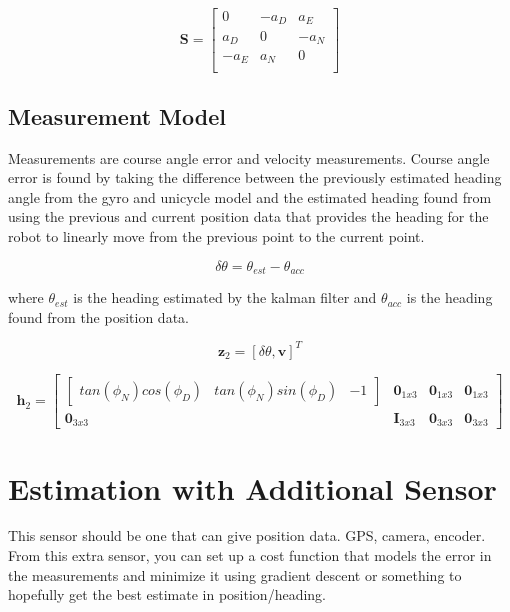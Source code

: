 \begin{equation}
  \boldsymbol{S} = \begin{bmatrix}
        0 & -a_D & a_E \\
        a_D & 0 & -a_N \\
        -a_E & a_N & 0 \\
      \end{bmatrix}
\end{equation}

\subsection{Measurement Model}

Measurements are course angle error and velocity measurements. Course angle error
is found by taking the difference between the previously estimated heading angle from the 
gyro and unicycle model and the estimated heading found from using the previous 
and current position data that provides the heading for the robot to linearly 
move from the previous point to the current point.

\begin{equation}
  \delta\theta = \theta_{est} - \theta_{acc}
\end{equation}

where $\theta_{est}$ is the heading estimated by the kalman filter and $\theta_{acc}$ 
is the heading found from the position data. 

\begin{equation}
  \boldsymbol{z}_2 = [\delta\theta, \boldsymbol{v}]^T
\end{equation}

\begin{equation}
  \boldsymbol{h}_2 = \begin{bmatrix}
      \begin{bmatrix}tan(\phi_N)cos(\phi_D) & tan(\phi_N)sin(\phi_D) & -1\end{bmatrix} & \boldsymbol{0}_{1x3} & \boldsymbol{0}_{1x3} & \boldsymbol{0}_{1x3} \\
      \boldsymbol{0}_{3x3} & \boldsymbol{I}_{3x3} & \boldsymbol{0}_{3x3} & \boldsymbol{0}_{3x3}
      \end{bmatrix}
\end{equation}

\section{Estimation with Additional Sensor}

This sensor should be one that can give position data. GPS, camera, encoder.
From this extra sensor, you can set up a cost function that models the error 
in the measurements and minimize it using gradient descent or something to 
hopefully get the best estimate in position/heading. 



